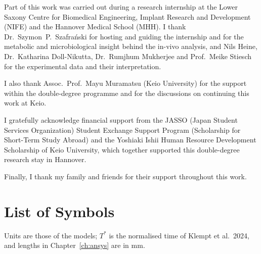 \documentclass[12pt, a4paper, twoside]{report}
\begin{document}
Part of this work was carried out during a research internship at the Lower
Saxony Centre for Biomedical Engineering, Implant Research and Development
(NIFE) and the Hannover Medical School (MHH). I thank Dr.\ Szymon~P.\
Szafra\'{n}ski for hosting and guiding the internship and for the metabolic and
microbiological insight behind the in-vivo analysis, and Nils Heine,
Dr.\ Katharina Doll-Nikutta, Dr.\ Rumjhum Mukherjee and Prof.\ Meike Stiesch
for the experimental data and their interpretation.

I also thank Assoc.\ Prof.\ Mayu Muramatsu (Keio University) for the
support within the double-degree programme and for the discussions on
continuing this work at Keio.

I gratefully acknowledge financial support from the JASSO (Japan Student Services
Organization) Student Exchange Support Program (Scholarship for Short-Term Study
Abroad) and the Yoshiaki Ishii Human Resource Development Scholarship of Keio
University, which together supported this double-degree research stay in Hannover.

Finally, I thank my family and friends for their support throughout this work.

\newpage
\tableofcontents
\listoffigures
\listoftables

\chapter*{List of Symbols}
Units are those of the models; $T^*$ is the normalised time of Klempt et
al.\ 2024, and lengths in Chapter~\ref{ch:ansys} are in mm.
\end{document}

